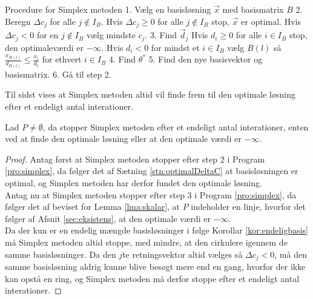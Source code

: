 \begin{pro}[label=pro:simplex,style=ingental]{Procedure for Simplex metoden}
1. Vælg en basisløsning $\vec{x}$ med basismatrix $B$
2. Beregn $\Delta c_j$ for alle $j \notin I_B$. 
   Hvis $\Delta c_j\geq 0$ for alle $j \notin I_B$ 
   	   stop, $\vec{x}$ er optimal.
   Hvis $\Delta c_j < 0$ for en $j \notin I_B$
       vælg mindste $c_j$.
3. Find $\vec{d}_j$
   Hvis $d_i \geq 0 $ for alle $i \in I_B$ 
       stop, den optimaleværdi er $- \infty$.
   Hvis $d_i < 0 $ for mindst et $i \in I_B$ 
       vælg $B(l)$ så $\frac{x_{B(l)}}{d_{B(l)}}\leq \frac{x_i}{d_i} $ for ethvert $i \in I_B$
4. Find $\theta^*$
5. Find den nye basisvektor og basismatrix.
6. Gå til step 2.
\end{pro}

Til sidst vises at Simplex metoden altid vil finde frem til den optimale løsning efter et endeligt antal interationer.
\begin{stn}
Lad $P \neq \emptyset$, da stopper Simplex metoden efter et endeligt antal interationer, enten ved at finde den optimale løsning eller at den optimale værdi er $- \infty$.
\end{stn}
\begin{proof}
Antag først at Simplex metoden stopper efter step 2 i Program \ref{pro:simplex}, da følger det af Sætning \ref{stn:optimalDeltaC}
at basisløsningen er optimal, og Simplex metoden har derfor fundet den optimale løsning.
\\ Antag nu at Simplex metoden stopper efter step 3 i Program \ref{pro:simplex}, da følger det af beviset for Lemma \ref{lma:skalar}, at $P$ indeholder en linje, hvorfor det følger af Afsnit \ref{sec:eksistens},
at den optimale værdi er $-\infty$.
\\ Da der kun er en endelig mængde basisløsninger i følge Korollar \ref{kor:endeligbasis}
må Simplex metoden altid stoppe, med mindre, at den cirkulere igennem de samme basisløsninger.
Da den $j$te retningsvektor altid vælges så $\Delta c_j < 0$, må den samme basisløsning aldrig kunne blive besøgt mere end en gang, hvorfor der ikke kan opstå en ring, og Simplex metoden må derfor stoppe efter et endeligt antal interationer.
\end{proof} 




